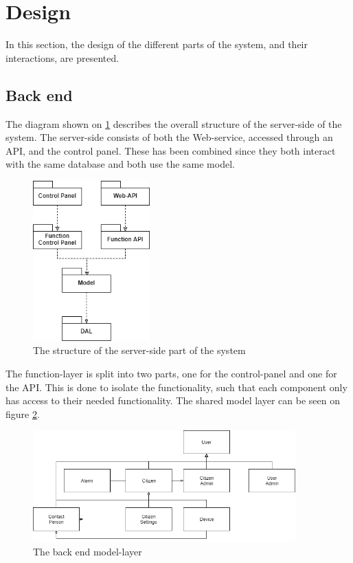 \section{Design}
In this section, the design of the different parts of the system, and their interactions, are presented.


\subsection{Back end}
\label{sec:back-end}
The diagram shown on \ref{fig:serversidestructure} describes the overall structure of the server-side of the system. The server-side consists of both the Web-service, accessed through an API, and the control panel. These has been combined since they both interact with the same database and both use the same model. 

\begin{figure}[H]
    \centering
    \includegraphics[width=0.4\textwidth]{Figures/serverSide.png}
    \caption{The structure of the server-side part of the system}
    \label{fig:serversidestructure}
\end{figure}

The function-layer is split into two parts, one for the control-panel and one for the API. This is done to isolate the functionality, such that each component only has access to their needed functionality. The shared model layer can be seen on figure \ref{fig:serversidemodel}.

\begin{figure}[H]
    \centering 
    \includegraphics[width=0.9\textwidth]{Figures/serverSidemodel.png}
    \caption{The back end model-layer}
    \label{fig:serversidemodel}
\end{figure}

